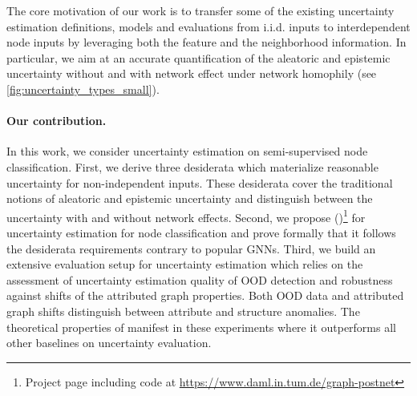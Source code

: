 The core motivation of our work is to transfer some of the existing uncertainty estimation definitions, models and evaluations from i.i.d. inputs to interdependent node inputs by leveraging both the feature and the neighborhood information. In particular, we aim at an accurate quantification of the aleatoric and epistemic uncertainty without and with network effect under network homophily (see \cref{fig:uncertainty_types_small}).

\paragraph{Our contribution.} In this work, we consider uncertainty estimation on semi-supervised node classification. First, we derive three desiderata which materialize reasonable uncertainty for non-independent inputs. These desiderata cover the traditional notions of aleatoric and epistemic uncertainty and distinguish between the uncertainty with and without network effects. Second, we propose \GPN{} (\GPNacro{})\footnote{Project page including code at \url{https://www.daml.in.tum.de/graph-postnet}} for uncertainty estimation for node classification and prove formally that it follows the desiderata requirements contrary to popular GNNs. Third, we build an extensive evaluation setup for uncertainty estimation which relies on the assessment of uncertainty estimation quality of OOD detection and robustness against shifts of the attributed graph properties. Both OOD data and attributed graph shifts distinguish between attribute and structure anomalies. The theoretical properties of \GPNacro{} manifest in these experiments where it outperforms all other baselines on uncertainty evaluation.

